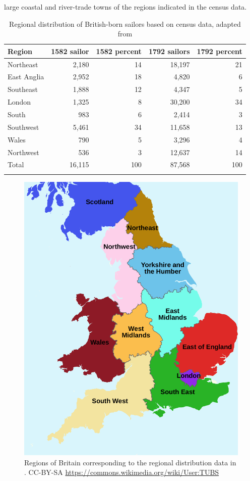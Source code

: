large coastal and river-trade towns of the regions indicated in the census data. 

\begin{table}
 \caption{Regional distribution of British-born sailors based on census data, adapted from \citet[76]{Earle1998}}
\label{tab:key:3.3}
\begin{tabular}{lrrrr}
\lsptoprule
Region & 1582 sailor & 1582 percent & 1792 sailors & 1792 percent \\
\midrule
Northeast  & 2,180 & 14 & 18,197 & 21\\
East Anglia & 2,952 & 18 & 4,820 & 6 \\
Southeast  & 1,888 & 12 & 4,347 & 5 \\
London  & 1,325 & 8 & 30,200 & 34 \\
South & 983 & 6 & 2,414 & 3 \\
Southwest & 5,461 & 34 & 11,658 & 13 \\
Wales & 790 & 5 & 3,296 & 4 \\
Northwest & 536 & 3 & 12,637 & 14 \\
\midrule 
Total & 16,115 & 100 & 87,568 & 100 \\
\lspbottomrule 
\end{tabular}
 \end{table}


\begin{figure}
\caption{Regions of Britain corresponding to the regional distribution data in .
{\tiny CC-BY-SA \url{https://commons.wikimedia.org/wiki/User:TUBS}}
}
\label{fig:key:3.2}
\includegraphics[height=.45\textheight]{figures/fig23.pdf}
\end{figure}

